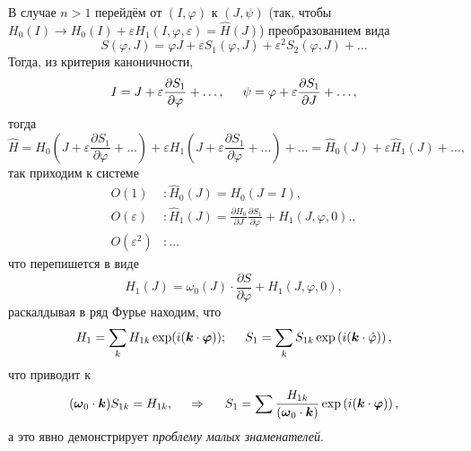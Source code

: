 В случае $n>1$ перейдём от $(I, \varphi)$ к $(J, \psi)$ (так, чтобы $H_0(I) \to H_0 (I) + \varepsilon H_1 (I, \varphi, \varepsilon) = \hat{H} (J)$)
преобразованием вида
\begin{equation*}
    S(\varphi, J) = \varphi J +  \varepsilon S_1 (\varphi, J) + \varepsilon^2 S_2 (\varphi, J) + \ldots
\end{equation*}
Тогда, из критерия каноничности,
\begin{equation*}
    I = J + \varepsilon \frac{\partial S_1}{\partial \varphi}  + \ldots,
    \hspace{5 mm}
    \psi = \varphi + \varepsilon \frac{\partial S_1}{\partial J} + \ldots,
\end{equation*}
тогда
\begin{equation*}
    \hat{H} = H_0 \left(J + \varepsilon \frac{\partial S_1}{\partial \varphi} + \ldots \right) + \varepsilon H_1 \left(J + \varepsilon \frac{\partial S_1}{\partial \varphi} + \ldots \right) + \ldots = \hat{H}_0 (J) + \varepsilon \hat{H}_1 (J) + \ldots,
\end{equation*}
так приходим к системе
\begin{align*}
    O(1) &\colon \hat{H}_0 (J) = H_0 (J=I), \\
    O(\varepsilon) &\colon \hat{H}_1 (J) = \frac{\partial H_0}{\partial J} \frac{\partial S_1}{\partial \varphi} + H_1 (J, \varphi, 0)., \\
    O(\varepsilon^2) &\colon \ldots
\end{align*}
что перепишется в виде
\begin{equation*}
    \hat{H}_1 (J) = \omega_0 (J) \cdot \frac{\partial S}{\partial \varphi} + H_1(J, \varphi, 0),
\end{equation*}
раскалдывая в ряд Фурье находим, что
\begin{equation*}
    H_1 = \sum_k H_{1k} \exp(i (\mbox{\boldmath $k$} \cdot \mbox{\boldmath $\varphi$}));
    \hspace{5 mm}
    S_1 = \sum_k S_{1k} \exp\left(
        i (\mbox{\boldmath $k$} \cdot \hat{\varphi})
    \right),
\end{equation*}
что приводит к 
\begin{equation*}
    (\mbox{\boldmath $\omega$}_0 \cdot \mbox{\boldmath $k$}) S_{1k} = H_{1k},
    \hspace{0.5cm} \Rightarrow \hspace{0.5cm}
    S_1 = \sum \frac{H_{1k}}{(\mbox{\boldmath $\omega$}_0 \cdot \mbox{\boldmath $k$}) } \exp\left(
        i (\mbox{\boldmath $k$} \cdot \mbox{\boldmath $\varphi$})
    \right),
\end{equation*}
а это явно демонстрирует \textit{проблему малых знаменателей}.

